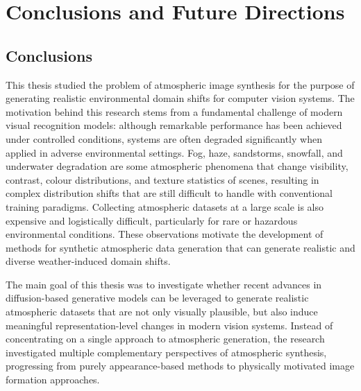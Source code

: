 \chapter{Conclusions and Future Directions}
\label{chap:conclusion}

\section{Conclusions}
\label{sec:conclusions}

\noindent This thesis studied the problem of atmospheric image synthesis for the purpose of generating realistic environmental domain shifts for computer vision systems. The motivation behind this research stems from a fundamental challenge of modern visual recognition models: although remarkable performance has been achieved under controlled conditions, systems are often degraded significantly when applied in adverse environmental settings. Fog, haze, sandstorms, snowfall, and underwater degradation are some atmospheric phenomena that change visibility, contrast, colour distributions, and texture statistics of scenes, resulting in complex distribution shifts that are still difficult to handle with conventional training paradigms. Collecting atmospheric datasets at a large scale is also expensive and logistically difficult, particularly for rare or hazardous environmental conditions. These observations motivate the development of methods for synthetic atmospheric data generation that can generate realistic and diverse weather-induced domain shifts.

\noindent The main goal of this thesis was to investigate whether recent advances in diffusion-based generative models can be leveraged to generate realistic atmospheric datasets that are not only visually plausible, but also induce meaningful representation-level changes in modern vision systems. Instead of concentrating on a single approach to atmospheric generation, the research investigated multiple complementary perspectives of atmospheric synthesis, progressing from purely appearance-based methods to physically motivated image formation approaches.


